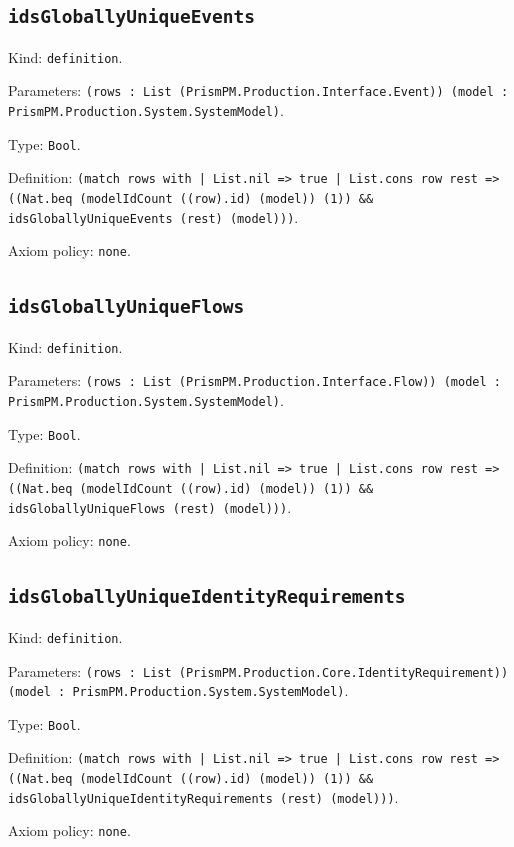\documentclass[11pt]{article}
\begin{document}
\subsection*{\texttt{idsGloballyUniqueEvents}}
\noindent Kind: \texttt{definition}.\par
\noindent Parameters: \texttt{(rows : List (PrismPM.Production.Interface.Event)) (model : PrismPM.Production.System.SystemModel)}.\par
\noindent Type: \texttt{Bool}.\par
\noindent Definition: \texttt{(match rows with | List.nil => true | List.cons row rest => ((Nat.beq (modelIdCount ((row).id) (model)) (1)) \&\& idsGloballyUniqueEvents (rest) (model)))}.\par
\noindent Axiom policy: \texttt{none}.\par
\subsection*{\texttt{idsGloballyUniqueFlows}}
\noindent Kind: \texttt{definition}.\par
\noindent Parameters: \texttt{(rows : List (PrismPM.Production.Interface.Flow)) (model : PrismPM.Production.System.SystemModel)}.\par
\noindent Type: \texttt{Bool}.\par
\noindent Definition: \texttt{(match rows with | List.nil => true | List.cons row rest => ((Nat.beq (modelIdCount ((row).id) (model)) (1)) \&\& idsGloballyUniqueFlows (rest) (model)))}.\par
\noindent Axiom policy: \texttt{none}.\par
\subsection*{\texttt{idsGloballyUniqueIdentityRequirements}}
\noindent Kind: \texttt{definition}.\par
\noindent Parameters: \texttt{(rows : List (PrismPM.Production.Core.IdentityRequirement)) (model : PrismPM.Production.System.SystemModel)}.\par
\noindent Type: \texttt{Bool}.\par
\noindent Definition: \texttt{(match rows with | List.nil => true | List.cons row rest => ((Nat.beq (modelIdCount ((row).id) (model)) (1)) \&\& idsGloballyUniqueIdentityRequirements (rest) (model)))}.\par
\noindent Axiom policy: \texttt{none}.\par
\end{document}
